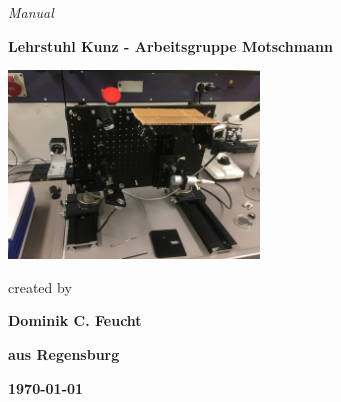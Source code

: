 \documentclass[12pt,a4paper,titlepage]{article}
\author{Dominik Feucht}
\begin{document}
	\begin{titlepage}
		
		\begin{center}
			
			\huge{\textit{Manual}\\}
			
			\vspace*{10mm}
			
			\fontsize{38pt}{30pt}\selectfont \textbf{}
		\end{center}
		
		\begin{center}
			
			\vspace{10mm}
			
			\Large{\textbf{Lehrstuhl Kunz - Arbeitsgruppe Motschmann }}\par
			
			\vspace{10mm}
			
			\includegraphics[width=0.5\textwidth]{PictureOfApparatus}\par
			
			\vspace{10mm}
			
			\Large{created by} \par
			\vspace{6mm}
			
			\Large{\textbf{Dominik C. Feucht}}\par
			\vspace{6mm}
			
			\Large{\textbf{aus Regensburg}}\par
			\vspace{6mm}
			
			\Large{\textbf{\today}}
			
			\vfill
			
		\end{center}
		
	\end{titlepage}
	
\end{document}
